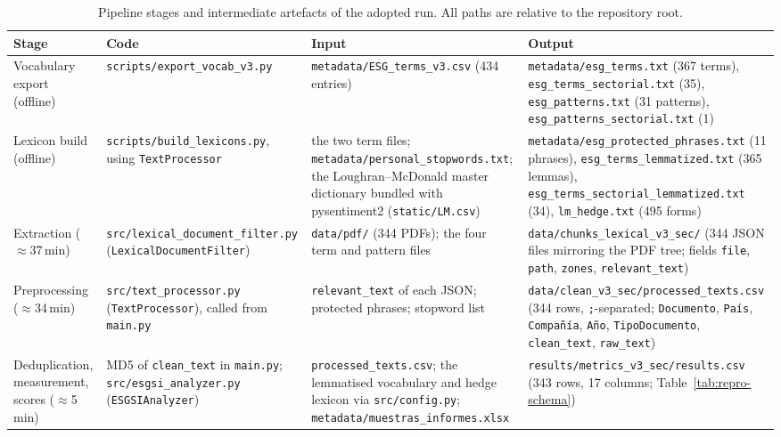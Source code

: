 \begin{table}[htbp]
\centering
\footnotesize
\caption{Pipeline stages and intermediate artefacts of the adopted run. All
paths are relative to the repository root.}
\label{tab:repro-pipeline}
\setlength{\tabcolsep}{4pt}
\begin{tabular}{@{}>{\raggedright\arraybackslash}p{2.2cm}>{\raggedright\arraybackslash}p{3.9cm}>{\raggedright\arraybackslash}p{3.9cm}>{\raggedright\arraybackslash}p{4.9cm}@{}}
\toprule
Stage & Code & Input & Output \\
\midrule
Vocabulary export (offline) & \nolinkurl{scripts/export_vocab_v3.py} & \nolinkurl{metadata/ESG_terms_v3.csv} (434 entries) & \nolinkurl{metadata/esg_terms.txt} (367 terms), \nolinkurl{esg_terms_sectorial.txt} (35), \nolinkurl{esg_patterns.txt} (31 patterns), \nolinkurl{esg_patterns_sectorial.txt} (1) \\
\addlinespace
Lexicon build (offline) & \nolinkurl{scripts/build_lexicons.py}, using \texttt{TextProcessor} & the two term files; \nolinkurl{metadata/personal_stopwords.txt}; the Loughran--McDonald master dictionary bundled with pysentiment2 (\nolinkurl{static/LM.csv}) & \nolinkurl{metadata/esg_protected_phrases.txt} (11 phrases), \nolinkurl{esg_terms_lemmatized.txt} (365 lemmas), \nolinkurl{esg_terms_sectorial_lemmatized.txt} (34), \nolinkurl{lm_hedge.txt} (495 forms) \\
\addlinespace
Extraction ($\approx$37\,min) & \nolinkurl{src/lexical_document_filter.py} (\texttt{LexicalDocumentFilter}) & \nolinkurl{data/pdf/} (344 PDFs); the four term and pattern files & \nolinkurl{data/chunks_lexical_v3_sec/} (344 JSON files mirroring the PDF tree; fields \texttt{file}, \texttt{path}, \texttt{zones}, \texttt{relevant\_text}) \\
\addlinespace
Preprocessing ($\approx$34\,min) & \nolinkurl{src/text_processor.py} (\texttt{TextProcessor}), called from \nolinkurl{main.py} & \texttt{relevant\_text} of each JSON; protected phrases; stopword list & \nolinkurl{data/clean_v3_sec/processed_texts.csv} (344 rows, \texttt{;}-separated; \texttt{Documento}, \texttt{País}, \texttt{Compañía}, \texttt{Año}, \texttt{TipoDocumento}, \texttt{clean\_text}, \texttt{raw\_text}) \\
\addlinespace
Deduplication, measurement, scores ($\approx$5\,min) & MD5 of \texttt{clean\_text} in \nolinkurl{main.py}; \nolinkurl{src/esgsi_analyzer.py} (\texttt{ESGSIAnalyzer}) & \nolinkurl{processed_texts.csv}; the lemmatised vocabulary and hedge lexicon via \nolinkurl{src/config.py}; \nolinkurl{metadata/muestras_informes.xlsx} & \nolinkurl{results/metrics_v3_sec/results.csv} (343 rows, 17 columns; Table~\ref{tab:repro-schema}) \\
\bottomrule
\end{tabular}
\end{table}

